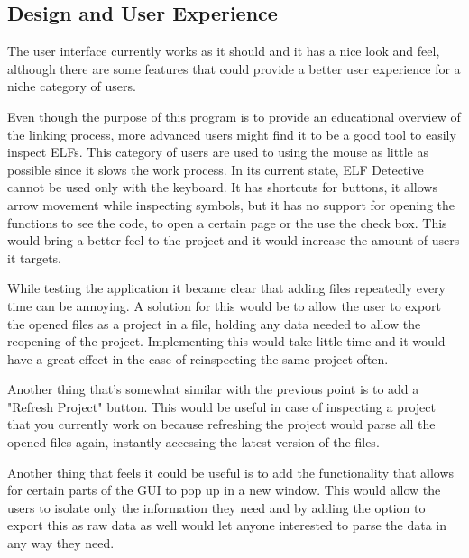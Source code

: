 \subsection{Design and User Experience}
\label{sub-sec:ux}

The user interface currently works as it should and it has a nice look and feel, although there are some features that could provide a better user experience for a niche category of users.

\fwpara Even though the purpose of this program is to provide an educational overview of the linking process, more advanced users might find it to be a good tool to easily inspect ELFs. This category of users are used to using the mouse as little as possible since it slows the work process. In its current state, ELF Detective cannot be used only with the keyboard. It has shortcuts for buttons, it allows arrow movement while inspecting symbols, but it has no support for opening the functions to see the code, to open a certain page or the use the check box. This would bring a better feel to the project and it would increase the amount of users it targets.

\fwpara While testing the application it became clear that adding files repeatedly every time can be annoying. A solution for this would be to allow the user to export the opened files as a project in a file, holding any data needed to allow the reopening of the project. Implementing this would take little time and it would have a great effect in the case of reinspecting the same project often.

\fwpara Another thing that's somewhat similar with the previous point is to add a "Refresh Project" button. This would be useful in case of inspecting a project that you currently work on because refreshing the project would parse all the opened files again, instantly accessing the latest version of the files.

\fwpara Another thing that feels it could be useful is to add the functionality that allows for certain parts of the GUI to pop up in a new window. This would allow the users to isolate only the information they need and by adding the option to export this as raw data as well would let anyone interested to parse the data in any way they need.
